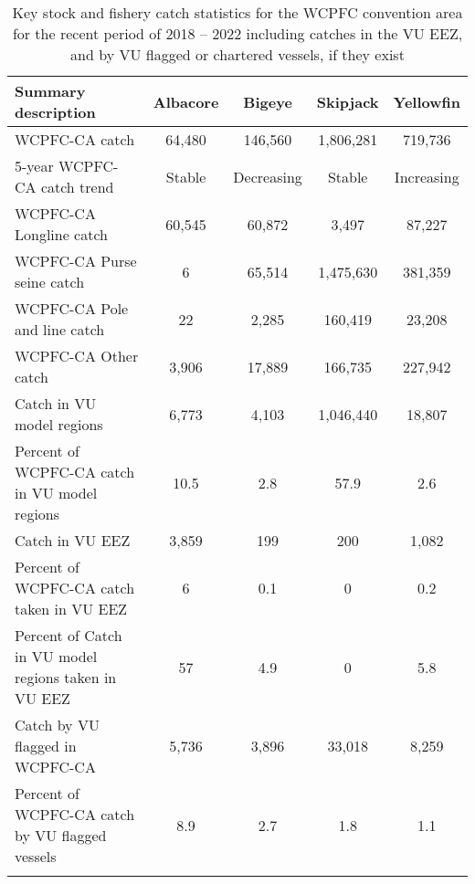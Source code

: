 \begin{longtable}{lcccc}
\caption{Key stock and fishery catch statistics for the WCPFC convention area for the recent period of 2018 -- 2022 including catches in the VU EEZ, and by VU flagged or chartered vessels, if they exist} \\ 
  \hline
Summary description & Albacore & Bigeye & Skipjack & Yellowfin \\ 
  \hline
WCPFC-CA catch & 64,480 & 146,560 & 1,806,281 & 719,736 \\ 
  5-year WCPFC-CA catch trend & Stable & Decreasing & Stable & Increasing \\ 
  WCPFC-CA Longline catch & 60,545 & 60,872 & 3,497 & 87,227 \\ 
  WCPFC-CA Purse seine catch & 6 & 65,514 & 1,475,630 & 381,359 \\ 
  WCPFC-CA Pole and line catch & 22 & 2,285 & 160,419 & 23,208 \\ 
  WCPFC-CA Other catch & 3,906 & 17,889 & 166,735 & 227,942 \\ 
  Catch in VU model regions & 6,773 & 4,103 & 1,046,440 & 18,807 \\ 
  Percent of WCPFC-CA catch in VU model regions & 10.5 & 2.8 & 57.9 & 2.6 \\ 
   \hline
Catch in VU EEZ & 3,859 & 199 & 200 & 1,082 \\ 
  Percent of WCPFC-CA catch taken in VU EEZ & 6 & 0.1 & 0 & 0.2 \\ 
  Percent of Catch in VU model regions taken in VU EEZ & 57 & 4.9 & 0 & 5.8 \\ 
  Catch by VU flagged in WCPFC-CA & 5,736 & 3,896 & 33,018 & 8,259 \\ 
  Percent of WCPFC-CA catch by VU flagged vessels & 8.9 & 2.7 & 1.8 & 1.1 \\ 
  \hline
\label{cat_sum_tab}
\end{longtable}
